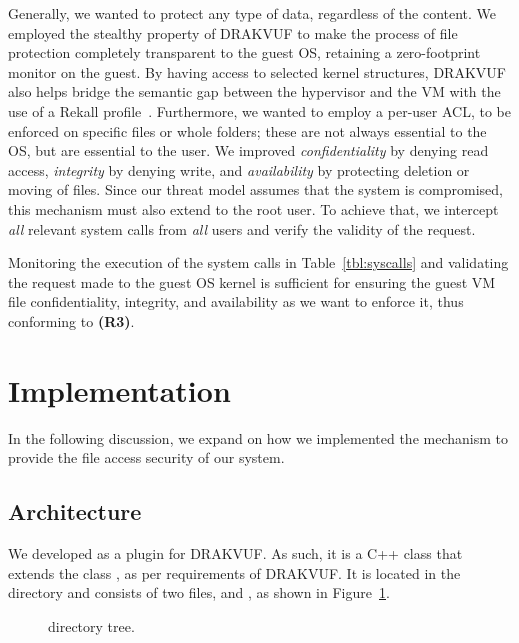 \par Generally, we wanted to protect any type of data, regardless of the content. We employed the stealthy property of DRAKVUF to make the process of file protection completely transparent to the guest \ac{OS}, retaining a zero-footprint monitor on the guest. By having access to selected kernel structures, DRAKVUF also helps bridge the semantic gap between the hypervisor and the \ac{VM} with the use of a Rekall profile~\cite{rekall}. Furthermore, we wanted to employ a per-user \ac{ACL}, to be enforced on specific files or whole folders; these are not always essential to the \ac{OS}, but are essential to the user. We improved \emph{confidentiality} by denying read access, \emph{integrity} by denying write, and \emph{availability} by protecting deletion or moving of files. Since our threat model assumes that the system is compromised, this mechanism must also extend to the root user. To achieve that, we intercept \emph{all} relevant system calls from \emph{all} users and verify the validity of the request. 

\par Monitoring the execution of the system calls in Table~\ref{tbl:syscalls} and validating the request made to the guest \ac{OS} kernel is sufficient for ensuring the guest \ac{VM} file confidentiality, integrity, and availability as we want to enforce it, thus conforming to \textbf{(R3)}.


\section{Implementation}\label{sec:implementation}

\par In the following discussion, we expand on how we implemented the mechanism to provide the file access security of our system.

\subsection{Architecture}\label{sub:arch}

\par We developed  as a plugin for DRAKVUF. As such, it is a C++ class that extends the class , as per requirements of DRAKVUF. It is located in the directory  and consists of two files,  and , as shown in Figure~\ref{fig:dir_tree}. 

\begin{figure}[ht]
	\centering
	
	\caption{ directory tree.}
	\label{fig:dir_tree}
\end{figure}

